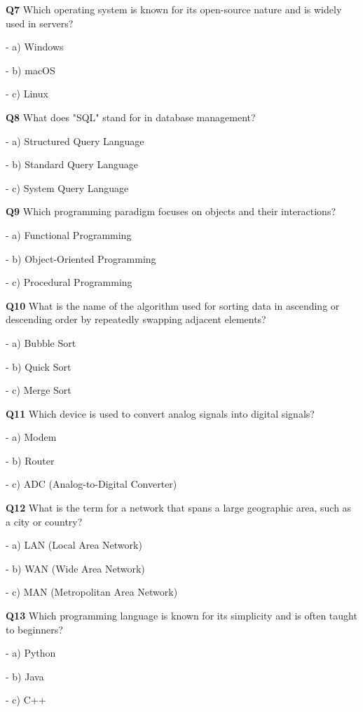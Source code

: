 \textbf{Q7} Which operating system is known for its open-source nature and is widely used in servers?\par
\quad - a) Windows\par
\quad - b) macOS\par
\quad - c) Linux\par

\textbf{Q8} What does "SQL" stand for in database management?\par
\quad - a) Structured Query Language\par
\quad - b) Standard Query Language\par
\quad - c) System Query Language\par

\textbf{Q9} Which programming paradigm focuses on objects and their interactions?\par
\quad - a) Functional Programming\par
\quad - b) Object-Oriented Programming\par
\quad - c) Procedural Programming\par

\textbf{Q10} What is the name of the algorithm used for sorting data in ascending or descending order by repeatedly swapping adjacent elements?\par
\quad - a) Bubble Sort\par
\quad - b) Quick Sort\par
\quad - c) Merge Sort\par

\textbf{Q11} Which device is used to convert analog signals into digital signals?\par
\quad - a) Modem\par
\quad - b) Router\par
\quad - c) ADC (Analog-to-Digital Converter)\par

\textbf{Q12} What is the term for a network that spans a large geographic area, such as a city or country?\par
\quad - a) LAN (Local Area Network)\par
\quad - b) WAN (Wide Area Network)\par
\quad - c) MAN (Metropolitan Area Network)\par

\textbf{Q13} Which programming language is known for its simplicity and is often taught to beginners?\par
\quad - a) Python\par
\quad - b) Java\par
\quad - c) C++\par

